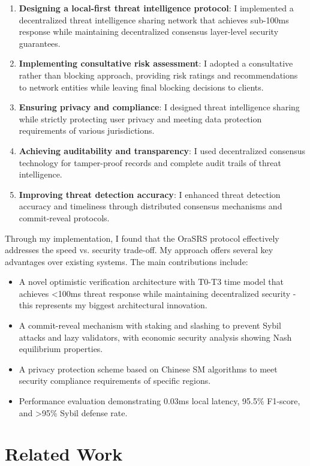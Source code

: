\documentclass[12pt]{article}
\begin{document}
\begin{enumerate}
\item \textbf{Designing a local-first threat intelligence protocol}: I implemented a decentralized threat intelligence sharing network that achieves sub-100ms response while maintaining decentralized consensus layer-level security guarantees.
\item \textbf{Implementing consultative risk assessment}: I adopted a consultative rather than blocking approach, providing risk ratings and recommendations to network entities while leaving final blocking decisions to clients.
\item \textbf{Ensuring privacy and compliance}: I designed threat intelligence sharing while strictly protecting user privacy and meeting data protection requirements of various jurisdictions.
\item \textbf{Achieving auditability and transparency}: I used decentralized consensus technology for tamper-proof records and complete audit trails of threat intelligence.
\item \textbf{Improving threat detection accuracy}: I enhanced threat detection accuracy and timeliness through distributed consensus mechanisms and commit-reveal protocols.
\end{enumerate}

Through my implementation, I found that the OraSRS protocol effectively addresses the speed vs. security trade-off. My approach offers several key advantages over existing systems. The main contributions include:

\begin{itemize}
\item A novel optimistic verification architecture with T0-T3 time model that achieves <100ms threat response while maintaining decentralized security - this represents my biggest architectural innovation.
\item A commit-reveal mechanism with staking and slashing to prevent Sybil attacks and lazy validators, with economic security analysis showing Nash equilibrium properties.
\item A privacy protection scheme based on Chinese SM algorithms to meet security compliance requirements of specific regions.
\item Performance evaluation demonstrating 0.03ms local latency, 95.5\% F1-score, and >95\% Sybil defense rate.
\end{itemize}

\section{Related Work}
\end{document}
